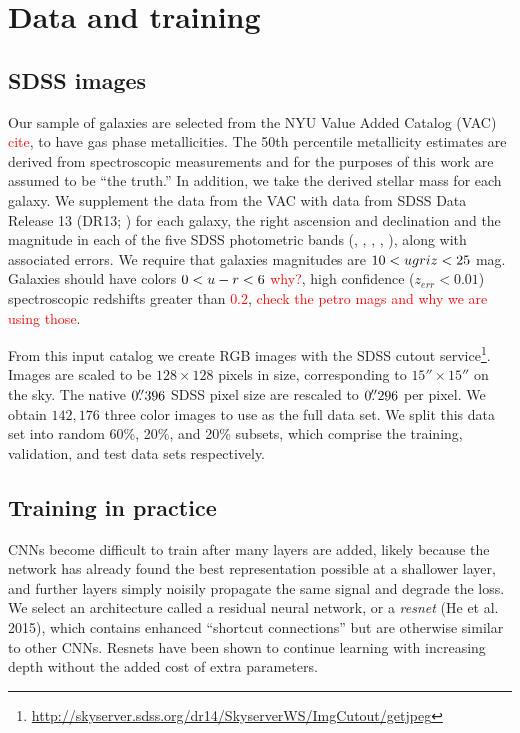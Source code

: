 \documentclass[fleqn,usenatbib]{mnras}
\newcommand{\editorial}[1]{\textcolor{red}{#1}}
\begin{document}
\section{Data and training}\label{sec:data}

\subsection{SDSS images}
Our sample of galaxies are selected from the NYU Value Added Catalog (VAC) \editorial{cite}, to have gas phase metallicities. The 50th percentile metallicity estimates \citep{Tremonti2004} are derived from spectroscopic measurements and for the purposes of this work are assumed to be ``the truth.'' In addition, we take the derived stellar mass for each galaxy.
We supplement the data from the VAC with data from SDSS Data Release 13 (DR13; \citealt{Albareti2017}) for each galaxy, the right ascension and declination and the magnitude in each of the five SDSS photometric bands (\sdssu, \sdssg, \sdssr, \sdssi, \sdssz), along with associated errors. We require that galaxies magnitudes are $10 < \hbox{$u$}\hbox{$g$}\hbox{$r$}\hbox{$i$}\hbox{$z$} < 25$ mag. Galaxies should have colors $0 < \hbox{$u$}-\hbox{$r$} < 6$ \editorial{why?}, high confidence ($z_{err} < 0.01$) spectroscopic redshifts greater than \editorial{$0.2$}, \editorial{check the petro mags and why we are using those}.

From this input catalog we create RGB images with the SDSS cutout service\footnote{\url{http://skyserver.sdss.org/dr14/SkyserverWS/ImgCutout/getjpeg}}. Images are scaled to be $128\times128$ pixels in size, corresponding to $15''\times15''$ on the sky. The native $0\hbox{$.\!\!^{\prime\prime}$}396$ SDSS pixel size are rescaled to $0\hbox{$.\!\!^{\prime\prime}$}296$ per pixel.
We obtain $142,176$ three color images to use as the full data set.
We split this data set into random 60\%, 20\%, and 20\% subsets, which comprise the training, validation, and test data sets respectively.

\subsection{Training in practice}

CNNs become difficult to train after many layers are added, likely because the network has already found the best representation possible at a shallower layer, and further layers simply noisily propagate the same signal and degrade the loss.
We select an architecture called a residual neural network, or a \textit{resnet} (He et al. 2015), which contains enhanced ``shortcut connections'' but are otherwise similar to other CNNs.
Resnets have been shown to continue learning with increasing depth without the added cost of extra parameters.
\end{document}
